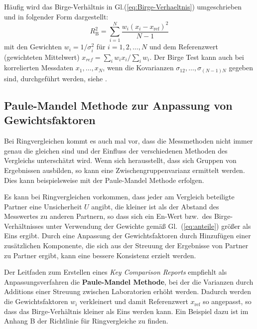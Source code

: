 Häufig wird das Birge-Verhältnis in Gl.(\ref{eq:Birge-Verhaeltnis})
umgeschrieben und in folgender Form dargestellt:
\begin{equation}
R_\mathrm{B}^2 = \sum_{i=1}^N \frac{w_i (x_i - x_\mathrm{ref})^2}{N-1}
\end{equation}
mit den Gewichten $w_i = 1/\sigma_i^2$ für $i=1,2,\ldots, N$ und dem
Referenzwert (gewichteten Mittelwert) $x_{ref}=\sum_i w_i x_i / \sum_i w_i$.
Der Birge Test kann auch bei korrelierten Messdaten $x_1,\ldots ,x_N$, wenn die
Kovarianzen $\sigma_{12},\ldots, \sigma_{(N-1)N}$ gegeben sind, durchgeführt werden, siehe \cite{Kac08}.

\subsection{Paule-Mandel Methode zur Anpassung von Gewichtsfaktoren}

Bei Ringvergleichen kommt es auch mal vor, dass die Messmethoden nicht immer genau die gleichen sind und der Einfluss der verschiedenen Methoden des Vergleichs unterschätzt wird. Wenn sich herausstellt, dass sich Gruppen von Ergebnissen ausbilden, so kann eine Zwischengruppenvarianz ermittelt werden. Dies kann beispielsweise mit der Paule-Mandel Methode erfolgen.

Es kann bei Ringvergleichen vorkommen, dass jeder am Vergleich beteiligte Partner eine
Unsicherheit $U$ angibt, die kleiner ist als der Abstand des Messwertes zu anderen Partnern,
so dass sich ein En-Wert bzw.\ des Birge-Verhältnisses unter Verwendung der Gewichte gemäß Gl.~(\ref{eq:anteile}) größer als Eins ergibt. Durch eine Anpassung der Gewichtsfaktoren durch Hinzufügen einer
zusätzlichen Komponente, die sich aus der Streuung der Ergebnisse von Partner zu Partner ergibt, kann eine bessere Konsistenz erzielt werden.

Der Leitfaden zum Erstellen eines \textsl{Key Comparison Reports}
\cite{GuideKey} empfiehlt als Anpassungsverfahren die \textbf{Paule-Mandel Methode},
bei der die Varianzen durch Additions einer Streuung zwischen Laboratorien
erhöht werden. Dadurch werden die Gewichtsfaktoren $w_i$ verkleinert und damit Referenzwert
$x_\mathrm{ref}$ so angepasst, so dass das Birge-Verhältnis kleiner als Eins werden kann.
Ein Beispiel dazu ist im Anhang B der Richtlinie für Ringvergleiche \cite{GuideKey} zu finden.

